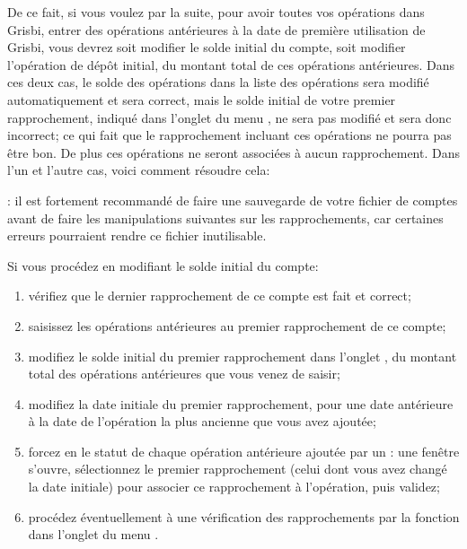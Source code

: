 De ce fait, si vous voulez par la suite, pour avoir toutes vos opérations dans Grisbi, entrer des opérations antérieures à la date de première utilisation de Grisbi, vous devrez soit modifier le solde initial du compte, soit modifier l'opération de dépôt initial, du montant total de ces opérations antérieures. Dans ces deux cas, le solde des opérations dans la liste des opérations sera modifié automatiquement et sera correct, mais le solde initial de votre premier rapprochement, indiqué dans l'onglet  du menu , ne sera pas modifié et sera donc incorrect; ce qui fait que le rapprochement incluant ces opérations ne pourra pas être bon. De plus ces opérations ne seront associées à aucun rapprochement. Dans l'un et l'autre cas, voici comment résoudre cela:

\Attention{}: il est fortement recommandé de faire une sauvegarde de votre fichier de comptes avant de faire les manipulations suivantes sur les rapprochements, car certaines erreurs pourraient rendre ce fichier inutilisable.

Si vous procédez en modifiant le solde initial du compte:
\begin{enumerate}
	\item vérifiez que le dernier rapprochement de ce compte est fait et correct;
	\item saisissez les opérations antérieures au premier rapprochement de ce compte;
	\item modifiez le solde initial du premier rapprochement dans l'onglet , du montant total des opérations antérieures que vous venez de saisir;
	\item modifiez la date initiale du premier rapprochement, pour une date antérieure à la date de l'opération la plus ancienne que vous avez ajoutée;
	\item forcez en  le statut de chaque opération antérieure ajoutée par un : une fenêtre s'ouvre, sélectionnez le premier rapprochement (celui dont vous avez changé la date initiale) pour associer ce rapprochement à l'opération, puis validez; 
	\item procédez éventuellement à une vérification des rapprochements par la fonction  dans l'onglet  du menu .
\end{enumerate}

